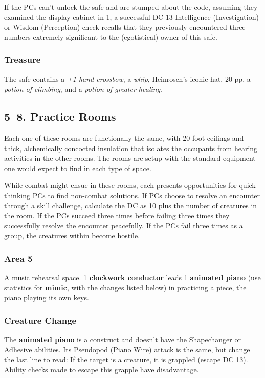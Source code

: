 \documentclass[10pt,a4paper,twoside,bg=print,twocolumn,openany,nodeprecatedcode]{dndbook}
\begin{document}
If the PCs can't unlock the safe and are stumped about the code, assuming they examined the display cabinet in 1, a successful DC 13 Intelligence (Investigation) or Wisdom (Perception) check recalls that they previously encountered three numbers extremely significant to the (egotistical) owner of this safe.

\subsubsection{Treasure}
The safe contains a \textit{+1 hand crossbow}, a \textit{whip}, Heinrosch's iconic hat, 20 pp, a \textit{potion of climbing}, and a \textit{potion of greater healing}.

\subsection{5–8. Practice Rooms}
Each one of these rooms are functionally the same, with 20-foot ceilings and thick, alchemically concocted insulation that isolates the occupants from hearing activities in the other rooms. The rooms are setup with the standard equipment one would expect to find in each type of space.

While combat might ensue in these rooms, each presents opportunities for quick-thinking PCs to find non-combat solutions. If PCs choose to resolve an encounter through a skill challenge, calculate the DC as 10 plus the number of creatures in the room. If the PCs succeed three times before failing three times they successfully resolve the encounter peacefully. If the PCs fail three times as a group, the creatures within become hostile.

\subsubsection{Area 5}
A music rehearsal space. 1 \textbf{clockwork conductor} leads 1 \textbf{animated piano} (use statistics for \textbf{mimic}, with the changes listed below) in practicing a piece, the piano playing its own keys.

\subsubsection{Creature Change}
The \textbf{animated piano} is a construct and doesn't have the Shapechanger or Adhesive abilities. Its Pseudopod (Piano Wire) attack is the same, but change the last line to read: If the target is a creature, it is grappled (escape DC 13). Ability checks made to escape this grapple have disadvantage.
\end{document}

